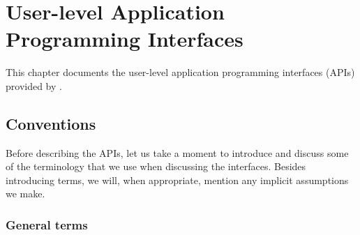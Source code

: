\chapter{User-level Application Programming Interfaces}
\label{chapter:api}

This chapter documents the user-level application programming interfaces
(APIs) provided by \libflamens.



\section{Conventions}

Before describing the \libflame APIs, let us take a moment to introduce
and discuss some of the terminology that we use when discussing the
interfaces.
Besides introducing terms, we will, when appropriate, mention any
implicit assumptions we make.



\subsection{General terms}


